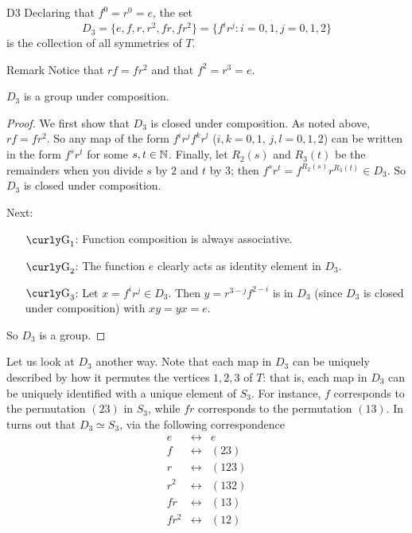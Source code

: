 \begin{example}{D3}
Declaring that $f^0=r^0=e$, the set $$D_3=\{e, f, r, r^2, fr, fr^2\}=\{f^ir^j:i=0,1, j=0,1,2\}$$ is the collection of all symmetries of $T$.

\begin{df}{Remark} Notice that $rf=fr^2$ and that $f^2=r^3=e$.\end{df}


\begin{thm}\label{di3} $D_3$ is a group under composition.
\end{thm}

\begin{proof} We first show that $D_3$ is closed under composition. As
noted above, $rf=fr^2$. So any map of the form $f^ir^jf^kr^l$
($i,k=0,1$, $j,l=0,1,2$) can be written in the form $f^sr^t$
for some $s,t \in \mathbb{N}$. Finally, let $R_2(s)$ and $R_3(t)$ be
the remainders when you divide $s$ by $2$ and $t$ by $3$; then
$f^sr^t=f^{R_2(s)}r^{R_3(t)} \in D_3$. So $D_3$ is closed under
composition.

Next:
\begin{enumerate}
\item[$\G_1$:] Function composition is always associative.
\item[$\G_2$:] The function $e$ clearly acts as identity
    element
    in $D_3$.
\item[$\G_3$:] Let $x=f^ir^j\in D_3$. Then $y=r^{3-j}f^{2-i}$
    is
    in $D_3$ (since $D_3$ is closed under composition) with $xy=yx=e$.
\end{enumerate}
So $D_3$ is a group.\end{proof}

Let us look at $D_3$ another way.  Note that each map in $D_3$ can be uniquely described by how it permutes the vertices $1,2,3$ of $T$: that is, each map in $D_3$ can be uniquely identified with a unique element of $S_3$.  For instance, $f$ corresponds to the permutation $(23)$ in $S_3$, while $fr$ corresponds to the permutation $(13)$.  In turns out that $D_3 \simeq S_3$, via the following correspondence
$$\begin{array}{ccl}
e &\leftrightarrow & e\\
f &\leftrightarrow & (23)\\
r &\leftrightarrow & (123)\\
r^2 &\leftrightarrow & (132)\\
fr &\leftrightarrow & (13)\\
fr^2 &\leftrightarrow & (12)
\end{array}$$
\end{example}




